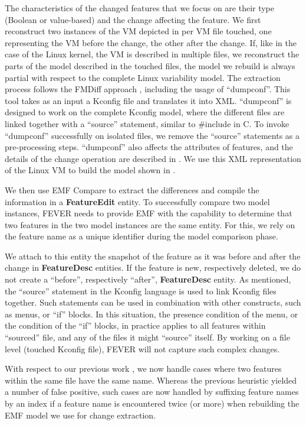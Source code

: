 The characteristics of the changed features that we focus on are their type (Boolean or value-based) and the change
affecting the feature.
We first reconstruct two instances of the VM depicted in  per VM file touched, 
one representing the VM before the change, the other after the change.
If, like in the case of the Linux kernel, the VM is described in multiple files,
we reconstruct the parts of the model described in the touched files, \ie the model we rebuild is always partial with respect to the complete Linux variability model.
The extraction process follows the FMDiff approach \citep{dintzner_analysing_2015}, including the usage of ``dumpconf''. 
This tool takes as an input a Kconfig file and translates it into XML. 
``dumpconf'' is designed to work on the complete Kconfig model, where the different files are linked together with a ``source'' statement, similar to \#include in C.
To invoke ``dumpconf'' successfully on isolated files, we remove the ``source'' statements as a pre-processing steps.
``dumpconf'' also affects the attributes of features, and the details of the change operation are described in \citep{dintzner_extracting_2013}.
We use this XML representation of the Linux VM to build the model shown in .

We then use EMF Compare to extract the differences and compile the information in a \textbf{FeatureEdit} entity. 
To successfully compare two model instances, FEVER needs to provide EMF with the capability to determine that
two features in the two model instances are the same entity.
For this, we rely on the feature name as a unique identifier during the model comparison phase.

We attach to this entity the snapshot of the feature as it was before and after the change in \textbf{FeatureDesc} entities.
If the feature is new, respectively deleted, we do not create a ``before'', respectively ``after'', \textbf{FeatureDesc} entity.
As mentioned, the ``source'' statement in the Kconfig language is used to link Kconfig files together.
Such statements can be used in combination with other constructs, such as menus, or ``if'' blocks.
In this situation, the presence condition of the menu, or the condition of the ``if'' blocks, in practice
applies to all features within ``sourced'' file, and any of the files it might ``source'' itself.
By working on a file level (touched Kconfig file), FEVER will not capture such complex changes.

With respect to our previous work \citep{dintzner_fever:_2016}, we now handle cases where two features within the same file have the same name.
Whereas the previous heuristic yielded a number of false positive, such cases are now handled by suffixing feature names by an index if a feature name is encountered
twice (or more) when rebuilding the EMF model we use for change extraction.


